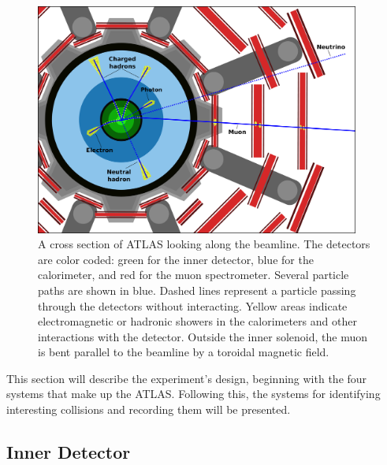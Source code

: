 \begin{figure}[htb]
\captionsetup[subfigure]{position=b}
\centering
\includegraphics[width=0.95\textwidth]{figures/experiment/particleId.pdf}
\caption{A cross section of ATLAS looking along the beamline. The detectors are color coded: green for the inner detector, blue for the calorimeter, and red for the muon spectrometer. Several particle paths are shown in blue. Dashed lines represent a particle passing through the detectors without interacting. Yellow areas indicate electromagnetic or hadronic showers in the calorimeters and other interactions with the detector. Outside the inner solenoid, the muon is bent parallel to the beamline by a toroidal magnetic field.}
\label{fig:particleInteractions}
\end{figure}

This section will describe the experiment's design, beginning with the four systems that make up the ATLAS.
Following this, the systems for identifying interesting collisions and recording them will be presented.




\subsection{Inner Detector}


